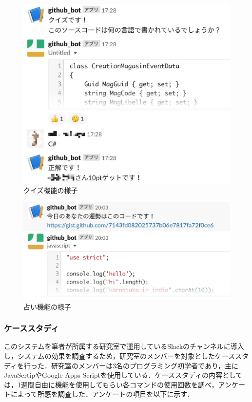 \begin{figure}[!h]
  \begin{center}
    \includegraphics[width=0.4\linewidth]{image/prototype_quiz.eps}
  \end{center}
    \vspace{-8mm} 
  \caption{クイズ機能の様子}
  \label{prototype_quiz}
\end{figure}

\begin{figure}[!h]
  \begin{center}
    \includegraphics[width=0.6\linewidth]{image/prototype_fortune.eps}
  \end{center}
    \vspace{-8mm} 
  \caption{占い機能の様子}
  \label{prototype_fortune}
\end{figure}


\subsubsection{ケーススタディ}
このシステムを筆者が所属する研究室で運用しているSlackのチャンネルに導入し，システムの効果を調査するため，研究室のメンバーを対象としたケーススタディを行った．研究室のメンバーは3名のプログラミング初学者であり，主にJavaScrtipやGoogle Apps Scriptを使用している．ケーススタディの内容としては，1週間自由に機能を使用してもらい各コマンドの使用回数を調べ，アンケートによって所感を調査した．アンケートの項目を以下に示す．

